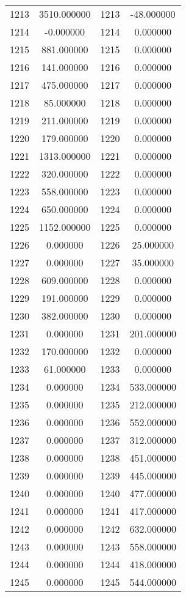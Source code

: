 \documentclass[12pt]{article}
\begin{document}
\begin{longtable}{@{}cccc@{}}
1213 & 3510.000000 & 1213 & -48.000000 \\
1214 & -0.000000 & 1214 & 0.000000 \\
1215 & 881.000000 & 1215 & 0.000000 \\
1216 & 141.000000 & 1216 & 0.000000 \\
1217 & 475.000000 & 1217 & 0.000000 \\
1218 & 85.000000 & 1218 & 0.000000 \\
1219 & 211.000000 & 1219 & 0.000000 \\
1220 & 179.000000 & 1220 & 0.000000 \\
1221 & 1313.000000 & 1221 & 0.000000 \\
1222 & 320.000000 & 1222 & 0.000000 \\
1223 & 558.000000 & 1223 & 0.000000 \\
1224 & 650.000000 & 1224 & 0.000000 \\
1225 & 1152.000000 & 1225 & 0.000000 \\
1226 & 0.000000 & 1226 & 25.000000 \\
1227 & 0.000000 & 1227 & 35.000000 \\
1228 & 609.000000 & 1228 & 0.000000 \\
1229 & 191.000000 & 1229 & 0.000000 \\
1230 & 382.000000 & 1230 & 0.000000 \\
1231 & 0.000000 & 1231 & 201.000000 \\
1232 & 170.000000 & 1232 & 0.000000 \\
1233 & 61.000000 & 1233 & 0.000000 \\
1234 & 0.000000 & 1234 & 533.000000 \\
1235 & 0.000000 & 1235 & 212.000000 \\
1236 & 0.000000 & 1236 & 552.000000 \\
1237 & 0.000000 & 1237 & 312.000000 \\
1238 & 0.000000 & 1238 & 451.000000 \\
1239 & 0.000000 & 1239 & 445.000000 \\
1240 & 0.000000 & 1240 & 477.000000 \\
1241 & 0.000000 & 1241 & 417.000000 \\
1242 & 0.000000 & 1242 & 632.000000 \\
1243 & 0.000000 & 1243 & 558.000000 \\
1244 & 0.000000 & 1244 & 418.000000 \\
1245 & 0.000000 & 1245 & 544.000000 \\

\end{longtable}
\end{document}
